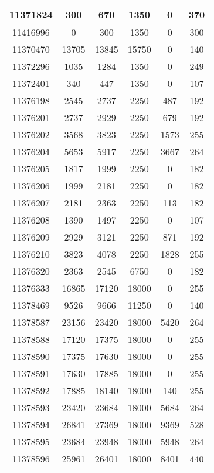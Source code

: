 \begin{appendices}
\begin{center}
\begin{longtable}{|c|c|c|c|c|c|}
11371824 & 300   & 670   & 1350  & 0     & 370 \\ \hline
11416996 & 0     & 300   & 1350  & 0     & 300 \\ \hline
11370470 & 13705 & 13845 & 15750 & 0     & 140 \\ \hline
11372296 & 1035  & 1284  & 1350  & 0     & 249 \\ \hline
11372401 & 340   & 447   & 1350  & 0     & 107 \\ \hline
11376198 & 2545  & 2737  & 2250  & 487   & 192 \\ \hline
11376201 & 2737  & 2929  & 2250  & 679   & 192 \\ \hline
11376202 & 3568  & 3823  & 2250  & 1573  & 255 \\ \hline
11376204 & 5653  & 5917  & 2250  & 3667  & 264 \\ \hline
11376205 & 1817  & 1999  & 2250  & 0     & 182 \\ \hline
11376206 & 1999  & 2181  & 2250  & 0     & 182 \\ \hline
11376207 & 2181  & 2363  & 2250  & 113   & 182 \\ \hline
11376208 & 1390  & 1497  & 2250  & 0     & 107 \\ \hline
11376209 & 2929  & 3121  & 2250  & 871   & 192 \\ \hline
11376210 & 3823  & 4078  & 2250  & 1828  & 255 \\ \hline
11376320 & 2363  & 2545  & 6750  & 0     & 182 \\ \hline
11376333 & 16865 & 17120 & 18000 & 0     & 255 \\ \hline
11378469 & 9526  & 9666  & 11250 & 0     & 140 \\ \hline
11378587 & 23156 & 23420 & 18000 & 5420  & 264 \\ \hline
11378588 & 17120 & 17375 & 18000 & 0     & 255 \\ \hline
11378590 & 17375 & 17630 & 18000 & 0     & 255 \\ \hline
11378591 & 17630 & 17885 & 18000 & 0     & 255 \\ \hline
11378592 & 17885 & 18140 & 18000 & 140   & 255 \\ \hline
11378593 & 23420 & 23684 & 18000 & 5684  & 264 \\ \hline
11378594 & 26841 & 27369 & 18000 & 9369  & 528 \\ \hline
11378595 & 23684 & 23948 & 18000 & 5948  & 264 \\ \hline
11378596 & 25961 & 26401 & 18000 & 8401  & 440 \\ \hline

\end{longtable}
\end{center}
\end{appendices}

